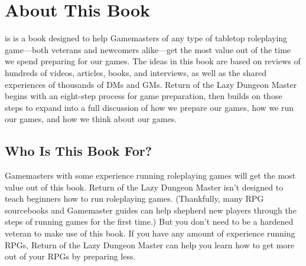 \documentclass[10pt,a4paper,twoside,bg=print,twocolumn,openany,nodeprecatedcode]{dndbook}
\begin{document}
\tableofcontents
\newpage
\chapter{About This Book}
 is is a book designed to help Gamemasters of any type of tabletop roleplaying game—both veterans and newcomers alike—get the most value out of the time we spend preparing for our games. The ideas in this book are based on reviews of hundreds of videos, articles, books, and interviews, as well as the shared experiences of thousands of DMs and GMs. Return of the Lazy Dungeon Master begins with an eight-step process for game preparation, then builds on those steps to expand into a full discussion of how we prepare our games, how we run our games, and how we think about our games.

\section{Who Is This Book For?}
Gamemasters with some experience running roleplaying games will get the most value out of this book. Return of the Lazy Dungeon Master isn't designed to teach beginners how to run roleplaying games. (Thankfully, many RPG sourcebooks and Gamemaster guides can help shepherd new players through the steps of running games for the first time.) But you don't need to be a hardened veteran to make use of this book. If you have any amount of experience running RPGs, Return of the Lazy Dungeon Master can help you learn how to get more out of your RPGs by preparing less.
\end{document}
